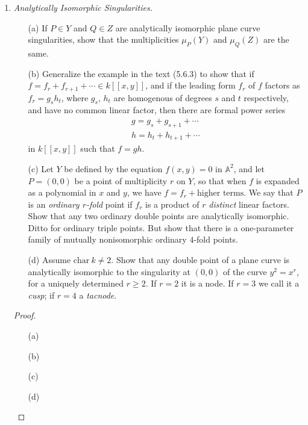 \documentclass[12pt]{article}
\newcommand{\A}{\mathbb{A}}
\theoremstyle{definition}
\begin{document}
\begin{enumerate} [label=\textbf{\arabic*.}, leftmargin=-0.05em]
\item \textit{Analytically Isomorphic Singularities.}
\begin{itemize}
    \item[(a)] If $P \in Y$ and $Q \in Z$ are analytically isomorphic plane curve singularities, show that the multiplicities $\mu_P(Y)$ and $\mu_Q(Z)$ are the same.
    \item[(b)] Generalize the example in the text (5.6.3) to show that if $f = f_r + f_{r + 1} + \cdots \in k[[x, y]]$, and if the leading form $f_r$ of $f$ factors as $f_r = g_s h_t$, where $g_s$, $h_t$ are homogenous of degrees $s$ and $t$ respectively, and have no common linear factor, then there are formal power series
    \begin{gather*}
        g = g_s + g_{s + 1} + \cdots \\
        h = h_t + h_{t + 1} + \cdots
    \end{gather*}
    in $k[[x, y]]$ such that $f = gh$.
    \item[(c)] Let $Y$ be defined by the equation $f(x, y) = 0$ in $\A^2$, and let $P = (0, 0)$ be a point of multiplicity $r$ on $Y$, so that when $f$ is expanded as a polynomial in $x$ and $y$, we have $f = f_r + \text{higher terms}$. We say that $P$ is an \textit{ordinary $r$-fold} point if $f_r$ is a product of $r$ \textit{distinct} linear factors. Show that any two ordinary double points are analytically isomorphic. Ditto for ordinary triple points. But show that there is a one-parameter family of mutually nonisomorphic ordinary $4$-fold points.
    \item[(d)] Assume $\text{char}~k \neq 2$. Show that any double point of a plane curve is analytically isomorphic to the singularity at $(0, 0)$ of the curve $y^2 = x^r$, for a uniquely determined $r \geq 2$. If $r = 2$ it is a node. If $r = 3$ we call it a \textit{cusp}; if $r = 4$ a \textit{tacnode}.
\end{itemize}

\begin{proof} $ $ \vspace{0pt}
    \begin{itemize}
        \item[(a)]
        \item[(b)]
        \item[(c)]
        \item[(d)]
    \end{itemize}
    
\end{proof}

\end{enumerate}
\end{document}
